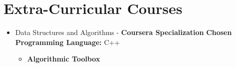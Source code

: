 \documentclass[a4paper,11pt]{article} %
\begin{document}
\section{Extra-Curricular Courses}
\begin{itemize}
\item Data Structures and Algorithms - \textbf{Coursera Specialization}
\textbf{Chosen Programming Language:} C++
\begin{itemize}
\item \textbf{Algorithmic Toolbox}
\iffalse
\textbf{Summary:} Introduction to different kind of algorithms (Divide and Conquer, Dynamic Programming, Greedy Algorithms, etc). The idea of the course is to provide the students with tools to affront different kind of problems and the best way to solve them.\\
\fi


\end{itemize}
\end{itemize}
\end{document}

